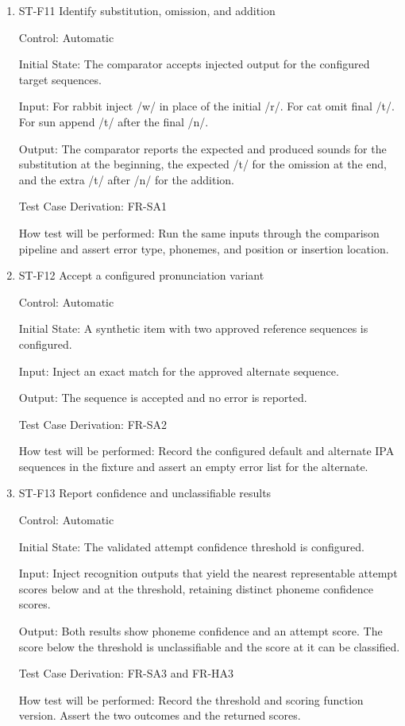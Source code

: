 \documentclass[12pt, titlepage]{article}
\begin{document}
\begin{enumerate}

\item{ST-F11 Identify substitution, omission, and addition\\}

Control: Automatic

Initial State: The comparator accepts injected output for the configured target sequences.

Input: For rabbit inject /w/ in place of the initial /r/. For cat omit final /t/. For sun append /t/ after the final /n/.

Output: The comparator reports the expected and produced sounds for the substitution at the beginning, the expected /t/ for the omission at the end, and the extra /t/ after /n/ for the addition.

Test Case Derivation: FR-SA1

How test will be performed: Run the same inputs through the comparison pipeline and assert error type, phonemes, and position or insertion location.

\item{ST-F12 Accept a configured pronunciation variant\\}

Control: Automatic

Initial State: A synthetic item with two approved reference sequences is configured.

Input: Inject an exact match for the approved alternate sequence.

Output: The sequence is accepted and no error is reported.

Test Case Derivation: FR-SA2

How test will be performed: Record the configured default and alternate IPA sequences in the fixture and assert an empty error list for the alternate.

\item{ST-F13 Report confidence and unclassifiable results\\}

Control: Automatic

Initial State: The validated attempt confidence threshold is configured.

Input: Inject recognition outputs that yield the nearest representable attempt scores below and at the threshold, retaining distinct phoneme confidence scores.

Output: Both results show phoneme confidence and an attempt score. The score below the threshold is unclassifiable and the score at it can be classified.

Test Case Derivation: FR-SA3 and FR-HA3

How test will be performed: Record the threshold and scoring function version. Assert the two outcomes and the returned scores.

\end{enumerate}
\end{document}
